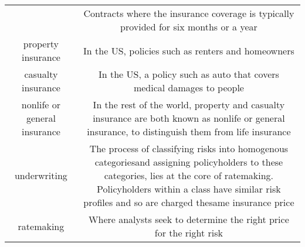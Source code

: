 \documentclass[]{book}
\theoremstyle{definition}
\theoremstyle{definition}
\theoremstyle{definition}
\theoremstyle{remark}
\begin{document}
\begin{longtable}[]{@{}cc@{}}
\begin{minipage}[t]{0.41\columnwidth}
\end{minipage} & \begin{minipage}[t]{0.42\columnwidth}\centering\strut
Contracts where the insurance coverage is typically provided for six
months or a year\strut
\end{minipage}\tabularnewline
\begin{minipage}[t]{0.41\columnwidth}\centering\strut
property insurance\strut
\end{minipage} & \begin{minipage}[t]{0.42\columnwidth}\centering\strut
In the US, policies such as renters and homeowners\strut
\end{minipage}\tabularnewline
\begin{minipage}[t]{0.41\columnwidth}\centering\strut
casualty insurance\strut
\end{minipage} & \begin{minipage}[t]{0.42\columnwidth}\centering\strut
In the US, a policy such as auto that covers medical damages to
people\strut
\end{minipage}\tabularnewline
\begin{minipage}[t]{0.41\columnwidth}\centering\strut
nonlife or general insurance\strut
\end{minipage} & \begin{minipage}[t]{0.42\columnwidth}\centering\strut
In the rest of the world, property and casualty insurance are both known
as nonlife or general insurance, to distinguish them from life
insurance\strut
\end{minipage}\tabularnewline
\begin{minipage}[t]{0.41\columnwidth}\centering\strut
underwriting\strut
\end{minipage} & \begin{minipage}[t]{0.42\columnwidth}\centering\strut
The process of classifying risks into homogenous categoriesand assigning
policyholders to these categories, lies at the core of ratemaking.
Policyholders within a class have similar risk profiles and so are
charged thesame insurance price\strut
\end{minipage}\tabularnewline
\begin{minipage}[t]{0.41\columnwidth}\centering\strut
ratemaking\strut
\end{minipage} & \begin{minipage}[t]{0.42\columnwidth}\centering\strut
Where analysts seek to determine the right price for the right
risk\strut
\end{minipage}\tabularnewline

\end{longtable}
\end{document}
